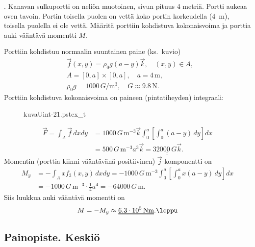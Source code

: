 \begin{Exa} . 
Kanavan sulkuportti on neliön muotoinen, sivun pituus 4 metriä. Portti aukeaa oven tavoin. 
Portin toisella puolen on vettä koko portin korkeudella (4\, m), toisella puolella ei ole
vettä. Määritä porttiin kohdistuva kokonaisvoima ja porttia auki vääntävä momentti $M$.
\end{Exa}
\begin{multicols}{2} \raggedcolumns
\ratk
Porttiin kohdistuu normaalin suuntainen paine (ks.\ kuvio)
\begin{align*}
&\vec f(x,y)=\rho_0g(a-y)\vec k, \quad (x,y)\in A, \\
&A=[0,a]\times [0,a], \quad a=4\,\text{m}, \\
&\rho_0g=1000\,G/\text{m}^3, \quad G \approx 9.8\,\text{N}.
\end{align*}
Porttiin kohdistuva kokonaisvoima on paineen (pintatiheyden) integraali:
\begin{figure}[H]
\begin{center}
{kuvaUint-21.pstex_t}
\end{center}
\end{figure}
\end{multicols}
\begin{align*}
\vec F=\int_A\vec f\, dxdy 
&= 1000\,G\,\text{m}^{-3}\vec k\int_0^a\left[\int_0^a (a-y)\,dy\right]dx \\
&=500\,G\,\text{m}^{-3}a^3\vec k=\underline{\underline{32000\,G\vec k}}.
\end{align*}
Momentin (porttia kiinni vääntävänä positiivinen) $\vec j$-komponentti on
\begin{align*}
M_y &= -\int_A xf_3(x,y)\,dxdy 
     = -1000\,G\,\text{m}^{-3}\int_0^a\left[\int_0^a x(a-y)\,dy\right]dx \\
    &=-1000\,G\,\text{m}^{-3}\cdot\frac{1}{4}a^4=-64000\,G\,\text{m}.
\end{align*}
Siis luukkua auki vääntävä momentti on  
\[
M = -M_y \approx \underline{\underline{6.3\cdot 10^5\,\text{Nm}}}. \loppu
\]

\subsection*{Painopiste. Keskiö}


